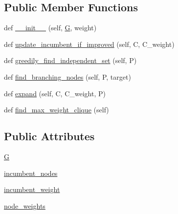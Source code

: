 \subsection*{Public Member Functions}
\begin{DoxyCompactItemize}
\item 
def \hyperlink{classnetworkx_1_1algorithms_1_1clique_1_1MaxWeightClique_adab3a8caa38decccd41f1fcd23c24834}{\+\_\+\+\_\+init\+\_\+\+\_\+} (self, \hyperlink{classnetworkx_1_1algorithms_1_1clique_1_1MaxWeightClique_a07894ff14e22ad9796a602d0eb32b02f}{G}, weight)
\item 
def \hyperlink{classnetworkx_1_1algorithms_1_1clique_1_1MaxWeightClique_aad07c0a3b0b66ba2fa5af06eada87942}{update\+\_\+incumbent\+\_\+if\+\_\+improved} (self, C, C\+\_\+weight)
\item 
def \hyperlink{classnetworkx_1_1algorithms_1_1clique_1_1MaxWeightClique_ab3cedc84d68078f16b90f26d056e7eb4}{greedily\+\_\+find\+\_\+independent\+\_\+set} (self, P)
\item 
def \hyperlink{classnetworkx_1_1algorithms_1_1clique_1_1MaxWeightClique_aa44f51a676815449e6aab9e0f0ccd513}{find\+\_\+branching\+\_\+nodes} (self, P, target)
\item 
def \hyperlink{classnetworkx_1_1algorithms_1_1clique_1_1MaxWeightClique_a363f31dbdd62931e93781c6dfc7057bd}{expand} (self, C, C\+\_\+weight, P)
\item 
def \hyperlink{classnetworkx_1_1algorithms_1_1clique_1_1MaxWeightClique_a8da95287135418157fd5300c715faac3}{find\+\_\+max\+\_\+weight\+\_\+clique} (self)
\end{DoxyCompactItemize}
\subsection*{Public Attributes}
\begin{DoxyCompactItemize}
\item 
\hyperlink{classnetworkx_1_1algorithms_1_1clique_1_1MaxWeightClique_a07894ff14e22ad9796a602d0eb32b02f}{G}
\item 
\hyperlink{classnetworkx_1_1algorithms_1_1clique_1_1MaxWeightClique_abfde92b0761db815dbf5c23885686d92}{incumbent\+\_\+nodes}
\item 
\hyperlink{classnetworkx_1_1algorithms_1_1clique_1_1MaxWeightClique_af3733710733e93a7bb84446df17efd3f}{incumbent\+\_\+weight}
\item 
\hyperlink{classnetworkx_1_1algorithms_1_1clique_1_1MaxWeightClique_a45893ce88d8cd16a600c2f8c91bbf731}{node\+\_\+weights}
\end{DoxyCompactItemize}


